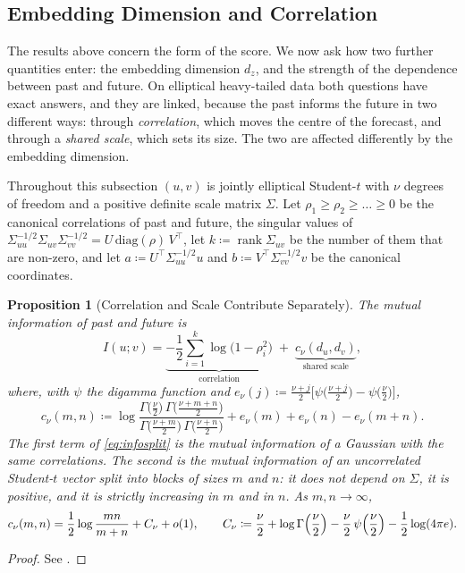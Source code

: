 \documentclass[11pt]{article}
\theoremstyle{plain}
\newtheorem{proposition}[theorem]{Proposition}
\theoremstyle{definition}
\theoremstyle{remark}
\newcommand{\define}{\coloneqq}
\begin{document}
\subsection{Embedding Dimension and Correlation}
\label{ssec:dimension}

The results above concern the form of the score. We now ask how two further
quantities enter: the embedding dimension $d_z$, and the strength of the
dependence between past and future. On elliptical heavy-tailed data both
questions have exact answers, and they are linked, because the past informs
the future in two different ways: through \emph{correlation}, which moves the
centre of the forecast, and through a \emph{shared scale}, which sets its
size. The two are affected differently by the embedding dimension.

Throughout this subsection $(u,v)$ is jointly elliptical Student-$t$ with
$\nu$ degrees of freedom and a positive definite scale matrix $\Sigma$. Let
$\rho_1\ge\rho_2\ge\dots\ge0$ be the canonical correlations of past and
future, the singular values of $\Sigma_{uu}^{-1/2}\Sigma_{uv}\Sigma_{vv}^{-1/2}=U\,\mathrm{diag}(\rho)\,V^{\top}$,
let $k\define\operatorname{rank}\Sigma_{uv}$ be the number of them that are
non-zero, and let $a\define U^{\top}\Sigma_{uu}^{-1/2}u$ and
$b\define V^{\top}\Sigma_{vv}^{-1/2}v$ be the canonical coordinates.

\begin{proposition}[Correlation and Scale Contribute Separately]
 \label{prop:infosplit}
 The mutual information of past and future is
 \begin{equation}
  I(u;v)=\underbrace{-\frac12\sum_{i=1}^{k}\log\bigl(1-\rho_i^{2}\bigr)}_{\text{correlation}}
  \;+\;\underbrace{c_\nu(d_u,d_v)}_{\text{shared scale}},
  \label{eq:infosplit}
 \end{equation}
 where, with $\psi$ the digamma function and
 $e_\nu(j)\define\frac{\nu+j}{2}\bigl[\psi\bigl(\frac{\nu+j}{2}\bigr)-\psi\bigl(\frac{\nu}{2}\bigr)\bigr]$,
 \begin{equation}
  c_\nu(m,n)\define\log\frac{\Gamma\bigl(\frac{\nu}{2}\bigr)\,\Gamma\bigl(\frac{\nu+m+n}{2}\bigr)}{\Gamma\bigl(\frac{\nu+m}{2}\bigr)\,\Gamma\bigl(\frac{\nu+n}{2}\bigr)}
  +e_\nu(m)+e_\nu(n)-e_\nu(m+n).
  \label{eq:cscale}
 \end{equation}
 The first term of \eqref{eq:infosplit} is the mutual information of a
 Gaussian with the same correlations. The second is the mutual information
 of an \emph{uncorrelated} Student-$t$ vector split into blocks of sizes $m$
 and $n$: it does not depend on $\Sigma$, it is positive, and it is strictly
 increasing in $m$ and in $n$. As $m,n\to\infty$,
 \begin{equation}
  c_\nu(m,n)=\frac12\log\frac{mn}{m+n}+C_\nu+o(1),\qquad
  C_\nu\define\frac\nu2+\log\Gamma\Bigl(\frac\nu2\Bigr)-\frac\nu2\,\psi\Bigl(\frac\nu2\Bigr)-\frac12\log(4\pi e).
  \label{eq:cscaleasym}
 \end{equation}
\end{proposition}
\begin{proof}
 See .
\end{proof}
\end{document}
